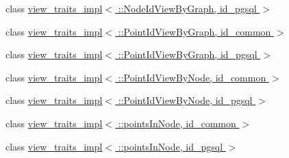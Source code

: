 \begin{DoxyCompactItemize}
\item 
class \hyperlink{classodb_1_1access_1_1view__traits__impl_3_01_1_1_node_id_view_by_graph_00_01id__pgsql_01_4}{view\+\_\+traits\+\_\+impl$<$ \+::\+Node\+Id\+View\+By\+Graph, id\+\_\+pgsql $>$}
\item 
class \hyperlink{classodb_1_1access_1_1view__traits__impl_3_01_1_1_point_id_view_by_graph_00_01id__common_01_4}{view\+\_\+traits\+\_\+impl$<$ \+::\+Point\+Id\+View\+By\+Graph, id\+\_\+common $>$}
\item 
class \hyperlink{classodb_1_1access_1_1view__traits__impl_3_01_1_1_point_id_view_by_graph_00_01id__pgsql_01_4}{view\+\_\+traits\+\_\+impl$<$ \+::\+Point\+Id\+View\+By\+Graph, id\+\_\+pgsql $>$}
\item 
class \hyperlink{classodb_1_1access_1_1view__traits__impl_3_01_1_1_point_id_view_by_node_00_01id__common_01_4}{view\+\_\+traits\+\_\+impl$<$ \+::\+Point\+Id\+View\+By\+Node, id\+\_\+common $>$}
\item 
class \hyperlink{classodb_1_1access_1_1view__traits__impl_3_01_1_1_point_id_view_by_node_00_01id__pgsql_01_4}{view\+\_\+traits\+\_\+impl$<$ \+::\+Point\+Id\+View\+By\+Node, id\+\_\+pgsql $>$}
\item 
class \hyperlink{classodb_1_1access_1_1view__traits__impl_3_01_1_1points_in_node_00_01id__common_01_4}{view\+\_\+traits\+\_\+impl$<$ \+::points\+In\+Node, id\+\_\+common $>$}
\item 
class \hyperlink{classodb_1_1access_1_1view__traits__impl_3_01_1_1points_in_node_00_01id__pgsql_01_4}{view\+\_\+traits\+\_\+impl$<$ \+::points\+In\+Node, id\+\_\+pgsql $>$}
\end{DoxyCompactItemize}
